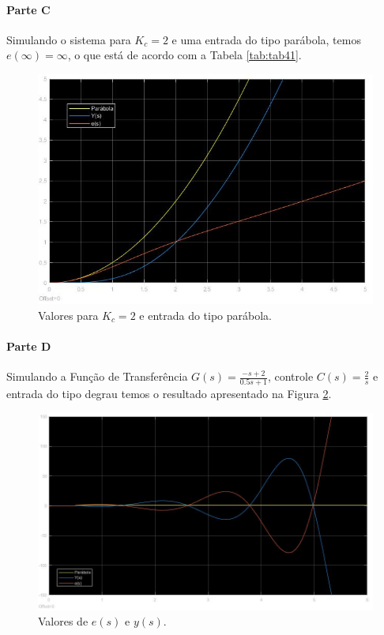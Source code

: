 \documentclass[
]{book}
\begin{document}
\hypertarget{parte-c-1}{%
\paragraph*{Parte C}\label{parte-c-1}}

Simulando o sistema para \(K_c = 2\) e uma entrada do tipo parábola, temos \(e(\infty) = \infty\), o que está de acordo com a Tabela \ref{tab:tab41}.

\begin{figure}
\includegraphics[width=0.8\linewidth]{Imagens/Lab4/Resolução/prob2C1} \caption{Valores para $K_c = 2$ e entrada do tipo parábola.}\label{fig:fig42C1}
\end{figure}

\hypertarget{parte-d}{%
\paragraph*{Parte D}\label{parte-d}}

Simulando a Função de Transferência \(G(s) = \frac {-s+2}{0.5s +1}\), controle \(C(s) = \frac {2}{s}\) e entrada do tipo degrau temos o resultado apresentado na Figura \ref{fig:fig42D1}.

\begin{figure}
\includegraphics[width=0.8\linewidth]{Imagens/Lab4/Resolução/prob2D1} \caption{Valores de $e(s)$ e $y(s)$.}\label{fig:fig42D1}
\end{figure}
\end{document}
